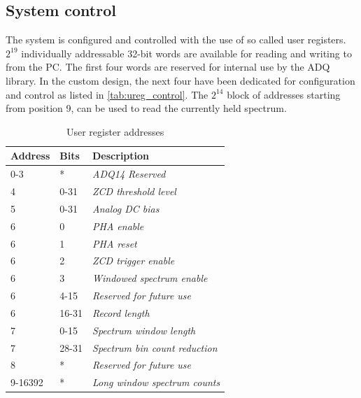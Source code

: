 \subsection{System control}

The system is configured and controlled with the use of so called 
user registers. $2^{19}$ individually addressable 32-bit words
are available for reading and writing to from the PC. The first
four words are reserved for internal use by the ADQ library. 
In the custom design, the next four have been 
dedicated for configuration and control as listed in \autoref{tab:ureg_control}.
The $2^{14}$ block of addresses starting from position 9, can
be used to read the currently held spectrum.

\begin{table}[H]
\caption{User register addresses}
\centering
  \begin{tabular}{l | l | l}
  {\bfseries Address} & {\bfseries Bits} & {\bfseries Description}\\
  \hline
  0-3  & *      & \textit {ADQ14 Reserved}\\ \hline
  4    & 0-31       & \textit {ZCD threshold level}\\ \hline
  5    & 0-31       & \textit {Analog DC bias}\\ \hline
  6    & 0       & \textit {PHA enable}\\ \hline
  6    & 1       & \textit {PHA reset}\\ \hline
  6    & 2       & \textit {ZCD trigger enable}\\ \hline
  6    & 3       & \textit {Windowed spectrum enable}\\ \hline
  6    & 4-15  & \textit {Reserved for future use}\\ \hline
  6    & 16-31   & \textit {Record length}\\ \hline
  7    & 0-15   & \textit {Spectrum window length}\\ \hline
  7    & 28-31   & \textit {Spectrum bin count reduction}\\ \hline
  8    & *  & \textit {Reserved for future use}\\ \hline
  9-16392    & *   & \textit {Long window spectrum counts}\\ 
  \end{tabular}
  \label{tab:ureg_control}
\end{table}

